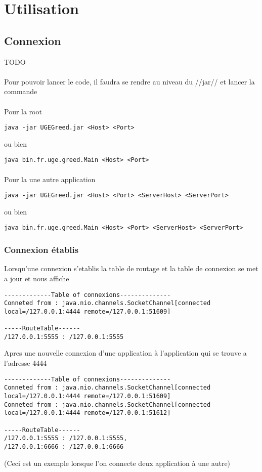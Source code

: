 \documentclass[a4paper,titlepage]{report}
\begin{document}
\section{Utilisation}
\subsection{Connexion}
TODO
\paragraph{}
Pour pouvoir lancer le code, il faudra se rendre au niveau du //jar// et lancer la commande 
\paragraph{}

Pour la root
\begin{lstlisting}
java -jar UGEGreed.jar <Host> <Port>
\end{lstlisting}
ou bien
\begin{lstlisting}
java bin.fr.uge.greed.Main <Host> <Port>
\end{lstlisting}
\paragraph{}
Pour la une autre application
\begin{lstlisting}
java -jar UGEGreed.jar <Host> <Port> <ServerHost> <ServerPort>
\end{lstlisting}
ou bien
\begin{lstlisting}
java bin.fr.uge.greed.Main <Host> <Port> <ServerHost> <ServerPort>
\end{lstlisting}
\subsubsection{Connexion établis}
Lorsqu'une connexion s'etablis la table de routage et la table de connexion se met a jour et nous affiche
\begin{lstlisting}
-------------Table of connexions--------------
Conneted from : java.nio.channels.SocketChannel[connected local=/127.0.0.1:4444 remote=/127.0.0.1:51609]

-----RouteTable------
/127.0.0.1:5555 : /127.0.0.1:5555
\end{lstlisting}
Apres une nouvelle connexion d'une application à l'application qui se trouve a l'adresse 4444
\begin{lstlisting}
-------------Table of connexions--------------
Conneted from : java.nio.channels.SocketChannel[connected local=/127.0.0.1:4444 remote=/127.0.0.1:51609]
Conneted from : java.nio.channels.SocketChannel[connected local=/127.0.0.1:4444 remote=/127.0.0.1:51612]

-----RouteTable------
/127.0.0.1:5555 : /127.0.0.1:5555,
/127.0.0.1:6666 : /127.0.0.1:6666
\end{lstlisting}
(Ceci est un exemple lorsque l'on connecte deux application à une autre)
\end{document}
